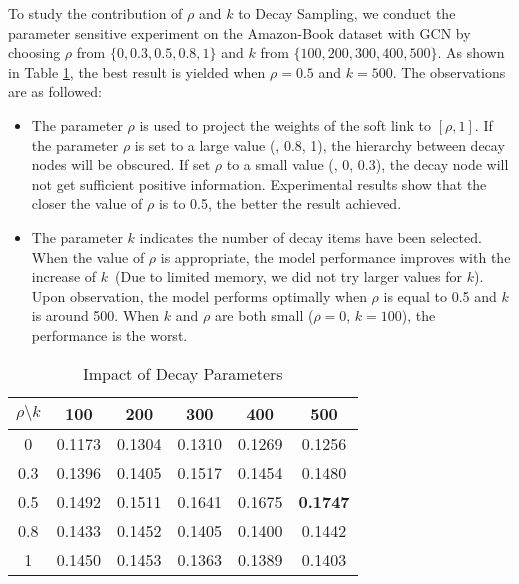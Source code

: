 To study the contribution of $\rho$ and $k$ to Decay Sampling, we conduct the parameter sensitive experiment on the Amazon-Book dataset with GCN by choosing $\rho$ from $\{0,0.3, 0.5, 0.8, 1\}$ and $k$ from $\{100,200,300,400,500\}$. As shown in Table \ref{decay},  the best result is yielded when $\rho=0.5$ and $k=500$. The observations are as followed:
\begin{itemize}
    \item The parameter $\rho$ is used to project the weights of the soft link to $\left[\rho,1\right]$. If the parameter $\rho$ is set to a large value (\eg, 0.8, 1), the hierarchy between decay nodes will be obscured. If set $\rho$ to a small value (\eg, 0, 0.3), the decay node will not get sufficient positive information.  Experimental results show that the closer the value of $\rho$ is to 0.5, the better the result achieved. 
    \item The parameter $k$ indicates the number of decay items have been selected. When the value of $\rho$ is appropriate, the model performance improves with the increase of $k$~(Due to limited memory, we did not try larger values for $k$). Upon observation, the model performs optimally when $\rho$ is equal to 0.5 and $k$ is around 500. When $k$ and $\rho$ are both small (\eg $\rho=0$, $k=100$), the performance is the worst.
\end{itemize}



\begin{table}[t]
\centering
\renewcommand\arraystretch{2    }
\caption{Impact of Decay Parameters}
\label{decay}
\begin{tabular}{c|ccccc}
\hline
$\rho \setminus k$  & 100  & 200 & 300 & 400 &500 \\ \hline \hline
0   & 0.1173 &0.1304 & 0.1310  & 0.1269&0.1256 \\ \hline
0.3 & 0.1396 & 0.1405 &0.1517   & 0.1454&0.1480 \\ \hline
0.5  &0.1492   & 0.1511  & 0.1641 &0.1675& \textbf{0.1747}\\ \hline
0.8 & 0.1433   & 0.1452  & 0.1405& 0.1400&0.1442\\ \hline
1& 0.1450 & 0.1453  & 0.1363   & 0.1389 &0.1403 \\ \hline
\end{tabular}
\end{table}

